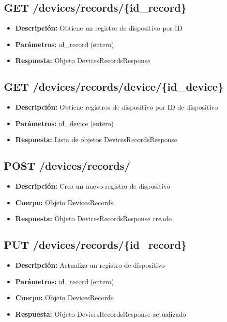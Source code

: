 \documentclass[12pt,letterpaper]{report}
\begin{document}
\subsection{GET /devices/records/\{id\_record\}}
\begin{itemize}
    \item \textbf{Descripción:} Obtiene un registro de dispositivo por ID
    \item \textbf{Parámetros:} id\_record (entero)
    \item \textbf{Respuesta:} Objeto DevicesRecordsResponse
\end{itemize}

\subsection{GET /devices/records/device/\{id\_device\}}
\begin{itemize}
    \item \textbf{Descripción:} Obtiene registros de dispositivo por ID de dispositivo
    \item \textbf{Parámetros:} id\_device (entero)
    \item \textbf{Respuesta:} Lista de objetos DevicesRecordsResponse
\end{itemize}

\subsection{POST /devices/records/}
\begin{itemize}
    \item \textbf{Descripción:} Crea un nuevo registro de dispositivo
    \item \textbf{Cuerpo:} Objeto DevicesRecords
    \item \textbf{Respuesta:} Objeto DevicesRecordsResponse creado
\end{itemize}

\subsection{PUT /devices/records/\{id\_record\}}
\begin{itemize}
    \item \textbf{Descripción:} Actualiza un registro de dispositivo
    \item \textbf{Parámetros:} id\_record (entero)
    \item \textbf{Cuerpo:} Objeto DevicesRecords
    \item \textbf{Respuesta:} Objeto DevicesRecordsResponse actualizado
\end{itemize}
\end{document}
